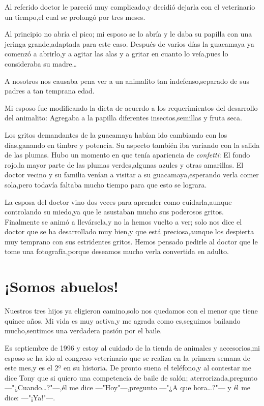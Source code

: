 \documentclass[letterpaper,12pt]{book}
\begin{document}
Al referido doctor le pareció muy complicado,y decidió dejarla con el veterinario un tiempo,el cual se prolongó por tres meses. 

Al principio no abría el pico; mi esposo se lo abría y le daba su papilla con una jeringa grande,adaptada para este caso. Después de varios días la guacamaya ya comenzó a abrirlo,y a agitar las alas y a gritar en cuanto lo veía,pues lo consideraba su madre\ldots

A nosotros nos causaba pena ver a un animalito tan indefenso,separado de sus padres a tan temprana edad. 

Mi esposo fue modificando la dieta de acuerdo a los requerimientos del desarrollo del animalito: Agregaba a la papilla diferentes insectos,semillas y fruta seca. 

Los gritos demandantes de la guacamaya habían ido cambiando con los días,ganando en timbre y potencia. Su aspecto también iba variando con la salida de las plumas. Hubo un momento en que tenía apariencia de \textit{confetti}: El fondo rojo,la mayor parte de las plumas verdes,algunas azules y otras amarillas. El doctor vecino y su familia venían a visitar a su guacamaya,esperando verla comer sola,pero todavía faltaba mucho tiempo para que esto se lograra. 

La esposa del doctor vino dos veces para aprender como cuidarla,aunque controlando su miedo,ya que le asustaban mucho sus poderosos gritos. Finalmente se animó a llevársela,y no la hemos vuelto a ver; solo nos dice el doctor que se ha desarrollado muy bien,y que está preciosa,aunque los despierta muy temprano con sus estridentes gritos. Hemos pensado pedirle al doctor que le tome una fotografía,porque deseamos mucho verla convertida en adulto.

\chapter{¡Somos abuelos!}
Nuestros tres hijos ya eligieron camino,solo nos quedamos con el menor que tiene quince años. Mi vida es muy activa,y me agrada como es,seguimos bailando mucho,sentimos una verdadera pasión por el baile.  

Es septiembre de 1996 y estoy al cuidado de la tienda de animales y accesorios,mi esposo se ha ido al congreso veterinario que se realiza en la primera semana de este mes,y es el 2º en su historia. De pronto suena el teléfono,y al contestar me dice Tony que si quiero una competencia de baile de salón; aterrorizada,pregunto ---"¿Cuando\ldots?"---,él me dice ---"Hoy"---,pregunto ---"¿A que hora\ldots?"--- y él me dice: ---"¡Ya!"---.
\end{document}

